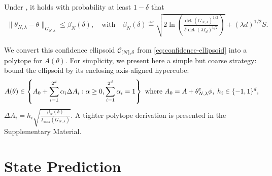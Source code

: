 \documentclass{article}
\begin{document}
\begin{theorem}
\label{thm:confidence_ellipsoid}
Under , it holds with probability at least $1-\delta$ that
\begin{align}
    \label{eq:confidence-ellipsoid}
    \| \theta_{N,\lambda}  - \theta\|_{G_{N,\lambda}} \leq \beta_N(\delta), \quad \text{with}\quad
    \beta_N(\delta)\eqdef \sqrt{2\ln \left(\frac{\det(G_{N,\lambda})^{1/2}}{\delta\det(\lambda I_d)^{1/2}}\right)}
     + (\lambda d)^{1/2}S.
\end{align}
\end{theorem}

We convert this confidence ellipsoid $\mathcal{C}_{[N],\delta}$ from \eqref{eq:confidence-ellipsoid} into a polytope for $A(\theta)$. For simplicity, we present here a simple but coarse strategy: bound the ellipsoid by its enclosing axis-aligned hypercube:
\begin{align}
    \label{eq:polytope}
     A(\theta)\in \left\{ A_0 +\sum_{i=1}^{2^d}\alpha_{i}\Delta A_{i}: \alpha\geq 0,  \sum_{i=1}^{2^d}\alpha_{i}=1\right\} \text{ where } A_0 = A + \theta_{N,\lambda}^{\mathsf{\scriptscriptstyle T}}\phi,\; h_i\in\{-1,1\}^d,
\end{align}
$\Delta A_{i} = {h_i} \sqrt{\frac{\beta_N(\delta)}{\lambda_{\max}(G_{N,\lambda})}}$. A tighter polytope derivation is presented in the Supplementary Material. %

\section{State Prediction}

\label{sec:prediction}
\end{document}
